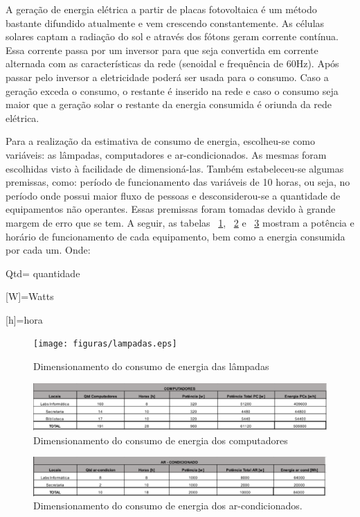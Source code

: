 A geração de energia elétrica a partir de placas fotovoltaica é um método bastante difundido atualmente e vem crescendo constantemente. As células solares captam a radiação do sol e através dos fótons geram corrente contínua. Essa corrente passa por um inversor para que seja convertida em corrente alternada com as características da rede (senoidal e frequência de 60Hz). Após passar pelo inversor a eletricidade poderá ser usada para o consumo. Caso a geração exceda o consumo, o restante é inserido na rede e caso o consumo seja maior que a geração solar o restante da energia consumida é oriunda da rede elétrica.

Para a realização da estimativa de consumo de energia, escolheu-se como variáveis: as lâmpadas, computadores e ar-condicionados. As mesmas foram escolhidas visto à facilidade de dimensioná-las. Também estabeleceu-se algumas premissas, como: período de funcionamento das variáveis de 10 horas, ou seja, no período onde possui maior fluxo de pessoas e desconsiderou-se a quantidade de equipamentos não operantes. Essas premissas foram tomadas devido à grande margem de erro que se tem. A seguir, as tabelas ~\ref{fig:lampadas}, ~\ref{fig:computadores} e ~\ref{fig:ar_condicionados} mostram a potência e horário de funcionamento de cada equipamento, bem como a energia consumida por cada um.
Onde:

\centerline{Qtd= quantidade}
\centerline{[W]=Watts}
\centerline{[h]=hora}

\begin{figure}[!h]
  \centering
  \texttt{[image: figuras/lampadas.eps]}
  \caption{Dimensionamento do consumo de energia das lâmpadas}
  \label{fig:lampadas}
\end{figure}

\begin{figure}[!h]
  \centering
  \includegraphics[keepaspectratio=true,scale=0.3]{figuras/computadores.eps}
  \caption{Dimensionamento do consumo de energia dos computadores}
  \label{fig:computadores}
\end{figure}

\begin{figure}[!h]
  \centering
  \includegraphics[keepaspectratio=true,scale=0.3]{figuras/ar_condicionados.eps}
  \caption{Dimensionamento do consumo de energia dos ar-condicionados.}
  \label{fig:ar_condicionados}
\end{figure}


